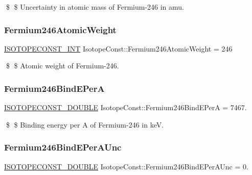 \$ \$ Uncertainty in atomic mass of Fermium-\/246 in amu. \mbox{\label{group___isotope_const-_fermium-_fm246_ga1413e9da0cdba99f48173dc3727a7705}} 
\subsubsection{\texorpdfstring{Fermium246\+Atomic\+Weight}{Fermium246AtomicWeight}}
{\footnotesize\ttfamily \mbox{\hyperlink{group___isotope_const-_macros_ga5f18360b3e99483a35c32d789e62621c}{I\+S\+O\+T\+O\+P\+E\+C\+O\+N\+S\+T\+\_\+\+I\+NT}} Isotope\+Const\+::\+Fermium246\+Atomic\+Weight = 246}

\$ \$ Atomic weight of Fermium-\/246. \mbox{\label{group___isotope_const-_fermium-_fm246_gaa6097c8b698c10487239653dcbab34ca}} 
\subsubsection{\texorpdfstring{Fermium246\+Bind\+E\+PerA}{Fermium246BindEPerA}}
{\footnotesize\ttfamily \mbox{\hyperlink{group___isotope_const-_macros_ga8f45a7272ce02c0b4c65c44636ed719a}{I\+S\+O\+T\+O\+P\+E\+C\+O\+N\+S\+T\+\_\+\+D\+O\+U\+B\+LE}} Isotope\+Const\+::\+Fermium246\+Bind\+E\+PerA = 7467.}

\$ \$ Binding energy per A of Fermium-\/246 in keV. \mbox{\label{group___isotope_const-_fermium-_fm246_gac70e15e681da1ad915232902f318acb1}} 
\subsubsection{\texorpdfstring{Fermium246\+Bind\+E\+Per\+A\+Unc}{Fermium246BindEPerAUnc}}
{\footnotesize\ttfamily \mbox{\hyperlink{group___isotope_const-_macros_ga8f45a7272ce02c0b4c65c44636ed719a}{I\+S\+O\+T\+O\+P\+E\+C\+O\+N\+S\+T\+\_\+\+D\+O\+U\+B\+LE}} Isotope\+Const\+::\+Fermium246\+Bind\+E\+Per\+A\+Unc = 0.}

